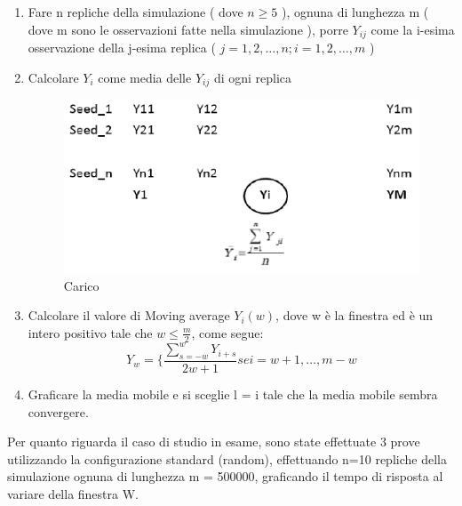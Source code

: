 \begin{enumerate}
	\item Fare n repliche della simulazione ( dove $n\geq5$ ), ognuna di lunghezza m ( dove m sono le osservazioni fatte nella simulazione ), porre $Y_{ij}$ come la i-esima osservazione della j-esima replica ( $j = 1,2,\ldots,n; i = 1,2,\ldots ,m$ )
	\item Calcolare $Y_{i}$ come media delle $Y_{ij}$ di ogni replica
\begin{figure}[H]
\begin{center}
\includegraphics[scale=0.5]{etc/ipsilon.png}
\caption{Carico}
\label{carico}
\end{center}
\end{figure}
	\item Calcolare il valore di Moving average $Y_{i}(w)$, dove w è la finestra ed è un intero positivo tale che $w \leq \frac{m}{2}$, come segue: 
$$
Y_{w} = \lbrace{ \frac{\sum_{s=-w}^{w} Y_{i+s}}{2w+1} se i=w+1, \ldots,m-w }
$$
	\item Graficare la media mobile e si sceglie l = i tale che la media mobile sembra convergere.
\end{enumerate}
Per quanto riguarda il caso di studio in esame, sono state effettuate 3 prove utilizzando la configurazione standard (random), effettuando n=10 repliche della simulazione ognuna di lunghezza
m = 500000, graficando il tempo di risposta al variare della finestra W.

